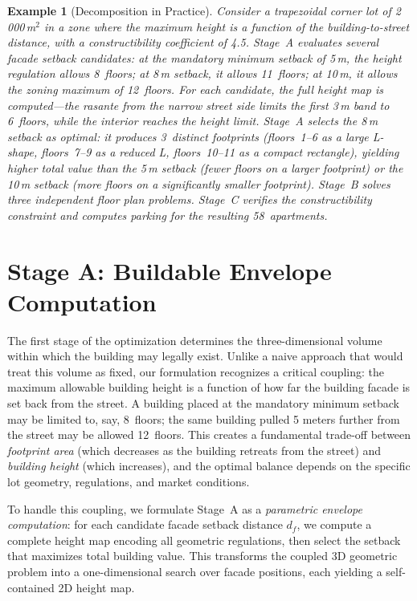 \documentclass[11pt,a4paper]{article}
\newtheorem{example}{Example}
\begin{document}
\begin{example}[Decomposition in Practice]
Consider a trapezoidal corner lot of 2\,000\,m$^2$ in a zone where the
maximum height is a function of the building-to-street distance, with a
constructibility coefficient of 4.5. Stage~A evaluates several facade
setback candidates: at the mandatory minimum setback of 5\,m, the
height regulation allows 8~floors; at 8\,m setback, it allows
11~floors; at 10\,m, it allows the zoning maximum of 12~floors. For
each candidate, the full height map is computed---the rasante from the
narrow street side limits the first 3\,m band to 6~floors, while the
interior reaches the height limit. Stage~A selects the 8\,m setback as
optimal: it produces 3~distinct footprints (floors~1--6 as a large
L-shape, floors~7--9 as a reduced L, floors~10--11 as a compact
rectangle), yielding higher total value than the 5\,m setback (fewer
floors on a larger footprint) or the 10\,m setback (more floors on a
significantly smaller footprint). Stage~B solves three independent
floor plan problems. Stage~C verifies the constructibility constraint
and computes parking for the resulting 58~apartments.
\end{example}


\section{Stage A: Buildable Envelope Computation}\label{sec:envelope}

The first stage of the optimization determines the three-dimensional
volume within which the building may legally exist. Unlike a naive
approach that would treat this volume as fixed, our formulation
recognizes a critical coupling: the maximum allowable building height
is a function of how far the building facade is set back from the
street. A building placed at the mandatory minimum setback may be
limited to, say, 8~floors; the same building pulled 5 meters further
from the street may be allowed 12~floors. This creates a fundamental
trade-off between \emph{footprint area} (which decreases as the
building retreats from the street) and \emph{building height} (which
increases), and the optimal balance depends on the specific lot
geometry, regulations, and market conditions.

To handle this coupling, we formulate Stage~A as a \emph{parametric
envelope computation}: for each candidate facade setback distance
$d_f$, we compute a complete height map encoding all geometric
regulations, then select the setback that maximizes total building
value. This transforms the coupled 3D geometric problem into a
one-dimensional search over facade positions, each yielding a
self-contained 2D height map.
\end{document}
